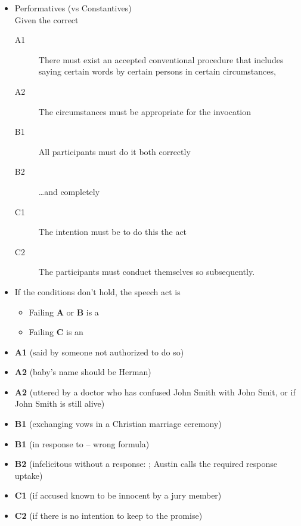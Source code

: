 \documentclass[a4paper,landscape,headrule,footrule,xetex]{foils}
\begin{document}
\begin{itemize}
\item Performatives (vs Constantives) 
\\ Given the correct 
  \begin{description}
  \item[A1] There must exist an accepted conventional procedure that
    includes saying certain words by certain persons in certain
    circumstances,
  \item[A2] The circumstances must be appropriate for the invocation
  \item[B1] All participants must do it both correctly
  \item[B2] \ldots  and completely
  \item[C1] The intention must be to do this the act
  \item[C2] The participants must conduct themselves so subsequently.
  \end{description}
\item If the conditions don't hold, the speech act is 
  \begin{itemize}
  \item Failing \textbf{A} or \textbf{B} is a 
  \item Failing \textbf{C} is an 
  \end{itemize}
  \end{itemize}

\begin{itemize} \addtolength{\itemsep}{-1ex}
\item \textbf{A1}  (said by someone not authorized to do so)
\item \textbf{A2}  (baby's name should
  be Herman)
\item \textbf{A2}  (uttered by a doctor who has confused John Smith
with John Smit, or if John Smith is still alive)
\item \textbf{B1}
 (exchanging vows in a Christian marriage ceremony)
\item \textbf{B1}
 (in response to  – wrong formula)
\item \textbf{B2}
 (infelicitous without a response: ; Austin calls the required response uptake)
\item \textbf{C1}
 (if accused known to be innocent by a jury member)
\item \textbf{C2}
 (if there is no intention to keep to the promise)
\end{itemize}
\end{document}
